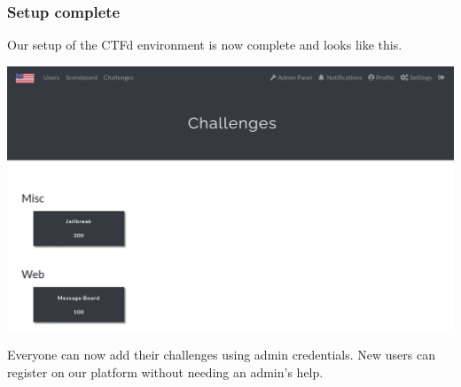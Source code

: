 \documentclass[../main.tex]{subfiles}
\begin{document}
\newpage

\subsubsection{Setup complete}

Our setup of the CTFd environment is now complete and looks like this.

\includegraphics[width=\linewidth]{images/ctfd.png}

Everyone can now add their challenges using admin credentials. New users can register on our platform without needing an admin's help.
\end{document}
